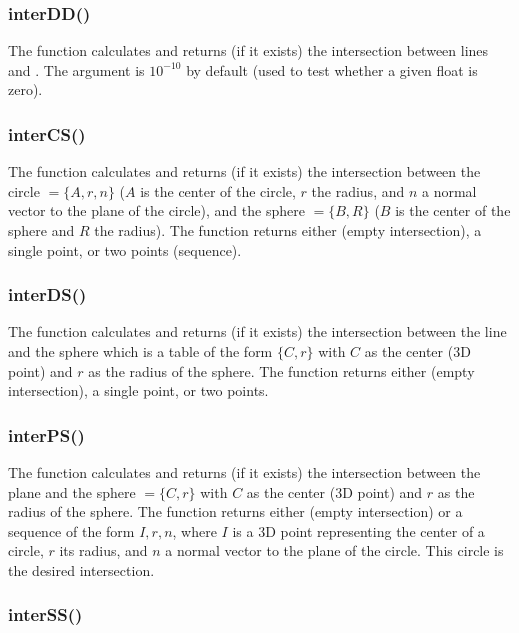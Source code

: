 \subsubsection{interDD()}

The function  calculates and returns (if it exists) the intersection between lines  and . The argument  is $10^{-10}$ by default (used to test whether a given float is zero).

\subsubsection{interCS()}

The function  calculates and returns (if it exists) the intersection between the circle $=\{A,r,n\}$ ($A$ is the center of the circle, $r$ the radius, and $n$ a normal vector to the plane of the circle), and the sphere $=\{B,R\}$ ($B$ is the center of the sphere and $R$ the radius). The function returns either \nil (empty intersection), a single point, or two points (sequence).

\subsubsection{interDS()}

The function  calculates and returns (if it exists) the intersection between the line  and the sphere  which is a table of the form $\{C,r\}$ with $C$ as the center (3D point) and $r$ as the radius of the sphere. The function returns either \nil (empty intersection), a single point, or two points.

\subsubsection{interPS()}

The function  calculates and returns (if it exists) the intersection between the plane  and the sphere $=\{C,r\}$ with $C$ as the center (3D point) and $r$ as the radius of the sphere. The function returns either \nil (empty intersection) or a sequence of the form $I,r,n$, where $I$ is a 3D point representing the center of a circle, $r$ its radius, and $n$ a normal vector to the plane of the circle. This circle is the desired intersection.

\subsubsection{interSS()}

